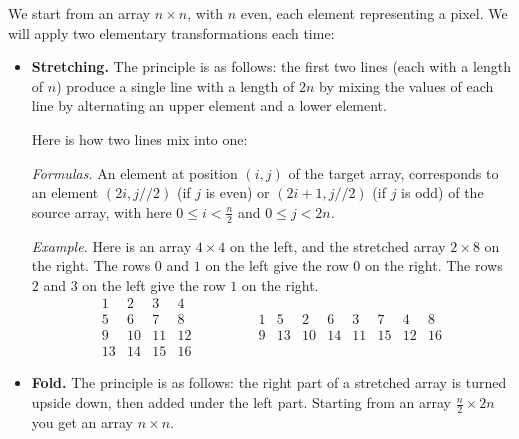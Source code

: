 \documentclass[11pt,class=report,crop=false]{standalone}
\begin{document}
\begin{cours}

We start from an array $n\times n$, with $n$ even, each element representing a pixel. 
We will apply two elementary transformations each time:

\begin{itemize}
  \item \textbf{Stretching.} The principle is as follows: the first two lines (each with a length of $n$) produce a single line with a length of $2n$ by mixing the values of each line by alternating an upper element and a lower element.

\medskip
 

Here is how two lines mix into one:

\medskip

\emph{Formulas.} An element at position $(i,j)$ of the target array, corresponds to an element $(2i,j//2)$ (if $j$ is even) or $(2i+1,j//2)$ (if $j$ is odd) of the source array, with here $0 \le i < \frac n2$ and $0 \le j < 2n$.

\medskip

\emph{Example.} Here is an array $4 \times 4$ on the left, and the stretched array $2 \times 8$ on the right.
The rows $0$ and $1$ on the left give the row $0$ on the right.
The rows $2$ and $3$ on the left give the row $1$ on the right.
$$\begin{array}{cccc} 
  1& 2& 3& 4\\ 
  5& 6& 7& 8\\  
  9&10&11&12\\  
 13&14&15&16  
\end{array}\qquad\qquad 
\begin{array}{cccccccc} 
  1& 5& 2& 6& 3& 7& 4& 8  \\
  9&13&10&14&11&15&12&16
\end{array}$$
  
  \item \textbf{Fold.} The principle is as follows: the right part of a stretched array is turned upside down, then added under the left part. Starting from an array $\frac n2 \times 2n$ you get an array $n \times n$.

 


\end{itemize}
\end{cours}
\end{document}
